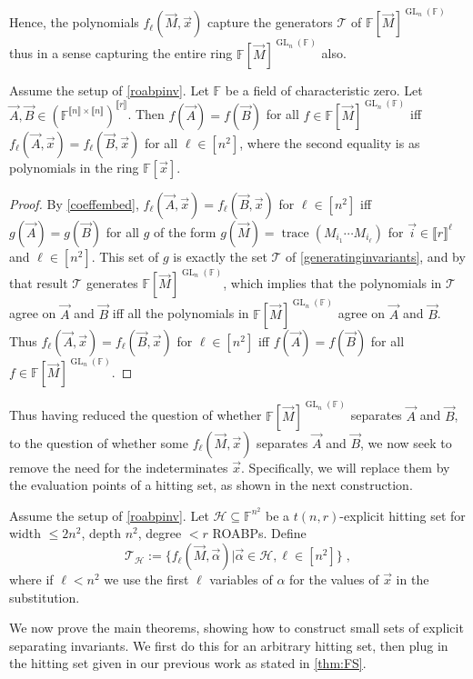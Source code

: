 \documentclass[letterpaper,11pt]{article}
\numberwithin{equation}{section}
\theoremstyle{plain}
\theoremstyle{remark}
\newcommand{\zr}[1]{{\llbracket {#1}\rrbracket}}
\DeclareMathOperator{\tr}{trace}
\DeclareMathOperator{\GL}{GL}
\newcommand{\F}{\mathbb{F}}
\newcommand{\cH}{\mathcal{H}}
\newcommand{\cT}{\mathcal{T}}
\newcommand{\eqdef}{:=}
\begin{document}
Hence, the polynomials $f_\ell(\vec{M},\vec{x})$ capture the generators $\cT$ of $\F[\vec{M}]^{\GL_n(\F)}$ thus in a sense capturing the entire ring $\F[\vec{M}]^{\GL_n(\F)}$ also.

\begin{corollary}
	\label{reducetoroabp}
	Assume the setup of \autoref{roabpinv}. Let $\F$ be a field of characteristic zero. Let $\vec{A},\vec{B}\in(\F^{\zr{n}\times \zr{n}})^{\zr{r}}$.  Then $f(\vec{A})= f(\vec{B})$ for all $f\in\F[\vec{M}]^{\GL_n(\F)}$ iff $f_\ell(\vec{A},\vec{x})= f_\ell(\vec{B},\vec{x})$ for all $\ell\in[n^2]$, where the second equality is as polynomials in the ring $\F[\vec{x}]$.
\end{corollary}
\begin{proof}
	By \autoref{coeffembed}, $f_\ell(\vec{A},\vec{x})=f_\ell(\vec{B},\vec{x})$ for $\ell\in[n^2]$ iff $g(\vec{A})=g(\vec{B})$ for all $g$ of the form $g(\vec{M})=\tr(M_{i_1}\cdots M_{i_\ell})$ for $\vec{i}\in\zr{r}^\ell$ and $\ell\in[n^2]$.  This set of $g$ is exactly the set $\cT$ of \autoref{generatinginvariants}, and by that result $\cT$ generates $\F[\vec{M}]^{\GL_n(\F)}$, which implies that the polynomials in $\cT$ agree on $\vec{A}$ and $\vec{B}$ iff all the polynomials in $\F[\vec{M}]^{\GL_n(\F)}$ agree on $\vec{A}$ and $\vec{B}$.  Thus $f_\ell(\vec{A},\vec{x})=f_\ell(\vec{B},\vec{x})$ for $\ell\in[n^2]$ iff $f(\vec{A})=f(\vec{B})$ for all $f\in\F[\vec{M}]^{\GL_n(\F)}$.
\end{proof}

Thus having reduced the question of whether $\F[\vec{M}]^{\GL_n(\F)}$ separates $\vec{A}$ and $\vec{B}$, to the question of whether some $f_\ell(\vec{M},\vec{x})$ separates $\vec{A}$ and $\vec{B}$, we now seek to remove the need for the indeterminates $\vec{x}$.  Specifically, we will replace them by the evaluation points of a hitting set, as shown in the next construction.
	
\begin{construction}\label{const:hittingset}
	Assume the setup of \autoref{roabpinv}. Let $\cH\subseteq\F^{n^2}$ be a $t(n,r)$-explicit hitting set for width $\le 2n^2$, depth $n^2$, degree $<r$ ROABPs. Define
	\[\cT_\cH\eqdef \{f_\ell(\vec{M},\vec{\alpha})|\vec{\alpha}\in\cH, \ell\in[n^2]\}\;,\]
	where if $\ell<n^2$ we use the first $\ell$ variables of $\alpha$ for the values of $\vec{x}$ in the substitution.
\end{construction}

We now prove the main theorems, showing how to construct small sets of explicit separating invariants.  We first do this for an arbitrary hitting set, then plug in the hitting set given in our previous work as stated in  \autoref{thm:FS}.
\end{document}
